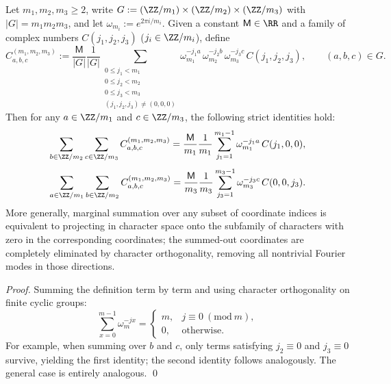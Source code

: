 \begin{lemma}\label{lem:arity-character-projection}
Let \(m_1,m_2,m_3\ge 2\), write
\(
G:=(\ZZ/m_1)\times(\ZZ/m_2)\times(\ZZ/m_3)
\)
with \(|G|=m_1m_2m_3\), and let \(\omega_{m_i}:=e^{2\pi i/m_i}\).
Given a constant \(\mathsf{M}\in\RR\) and a family of complex numbers \(C(j_1,j_2,j_3)\) (\(j_i\in\ZZ/m_i\)), define
\[
C^{(m_1,m_2,m_3)}_{a,b,c}
:=
\frac{\mathsf{M}}{|G|}
\frac{1}{|G|}
\!\!\!\sum_{\substack{0\le j_1<m_1\\0\le j_2<m_2\\0\le j_3<m_3\\(j_1,j_2,j_3)\ne(0,0,0)}}
\omega_{m_1}^{-j_1a}\,\omega_{m_2}^{-j_2b}\,\omega_{m_3}^{-j_3c}\,C(j_1,j_2,j_3),
\qquad (a,b,c)\in G.
\]
Then for any \(a\in\ZZ/m_1\) and \(c\in\ZZ/m_3\), the following strict identities hold:
\[
\sum_{b\in\ZZ/m_2}\sum_{c\in\ZZ/m_3} C^{(m_1,m_2,m_3)}_{a,b,c}
=
\frac{\mathsf{M}}{m_1}
\frac{1}{m_1}\sum_{j_1=1}^{m_1-1}\omega_{m_1}^{-j_1a}\,C(j_1,0,0),
\]
\[
\sum_{a\in\ZZ/m_1}\sum_{b\in\ZZ/m_2} C^{(m_1,m_2,m_3)}_{a,b,c}
=
\frac{\mathsf{M}}{m_3}
\frac{1}{m_3}\sum_{j_3=1}^{m_3-1}\omega_{m_3}^{-j_3c}\,C(0,0,j_3).
\]
More generally, marginal summation over any subset of coordinate indices is equivalent to projecting in character space onto the subfamily of characters with zero in the corresponding coordinates; the summed-out coordinates are completely eliminated by character orthogonality, removing all nontrivial Fourier modes in those directions.
\end{lemma}

\begin{proof}
Summing the definition term by term and using character orthogonality on finite cyclic groups:
\[
\sum_{x=0}^{m-1}\omega_m^{-jx}
=
\begin{cases}
m,& j\equiv 0\ (\mathrm{mod}\ m),\\
0,& \text{otherwise}.
\end{cases}
\]
For example, when summing over \(b\) and \(c\), only terms satisfying \(j_2\equiv 0\) and \(j_3\equiv 0\) survive, yielding the first identity; the second identity follows analogously. The general case is entirely analogous. \qed
\end{proof}

